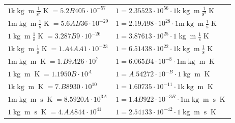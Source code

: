 \begin{center}
\begin{longtable}{l l}
{\color{gray}$1 \bm{\mathrm{ k}}\operatorname{kg}{\operatorname{m}}\frac1{\operatorname{s}^2}{}{\operatorname{K}} = 5.2B405\cdot10^{-57} $}   & {\color{gray}$ 1 = 2.35523\cdot10^{56} \cdot 1 \bm{\mathrm{ k}}\operatorname{kg}{\operatorname{m}}\frac1{\operatorname{s}^2}{}{\operatorname{K}}$}  \\
{\color{gray}$1 \bm{\mathrm{ m}}\operatorname{kg}{\operatorname{m}}\frac1{\operatorname{s}}{}{\operatorname{K}} = 5.6AB36\cdot10^{-29} $}   & {\color{gray}$ 1 = 2.19A98\cdot10^{28} \cdot 1 \bm{\mathrm{ m}}\operatorname{kg}{\operatorname{m}}\frac1{\operatorname{s}}{}{\operatorname{K}}$}  \\
{\color{black}$1 \bm{\mathrm{ }}\operatorname{kg}{\operatorname{m}}\frac1{\operatorname{s}}{}{\operatorname{K}} = 3.287B9\cdot10^{-26} $}   & {\color{black}$ 1 = 3.87613\cdot10^{25} \cdot 1 \bm{\mathrm{ }}\operatorname{kg}{\operatorname{m}}\frac1{\operatorname{s}}{}{\operatorname{K}}$}  \\
{\color{gray}$1 \bm{\mathrm{ k}}\operatorname{kg}{\operatorname{m}}\frac1{\operatorname{s}}{}{\operatorname{K}} = 1.A4AA1\cdot10^{-23} $}   & {\color{gray}$ 1 = 6.51438\cdot10^{22} \cdot 1 \bm{\mathrm{ k}}\operatorname{kg}{\operatorname{m}}\frac1{\operatorname{s}}{}{\operatorname{K}}$}  \\
{\color{gray}$1 \bm{\mathrm{ m}}\operatorname{kg}{\operatorname{m}}{}{}{\operatorname{K}} = 1.B9A26\cdot10^{7} $}   & {\color{gray}$ 1 = 6.065B4\cdot10^{-8} \cdot 1 \bm{\mathrm{ m}}\operatorname{kg}{\operatorname{m}}{}{}{\operatorname{K}}$}  \\
{\color{black}$1 \bm{\mathrm{ }}\operatorname{kg}{\operatorname{m}}{}{}{\operatorname{K}} = 1.1950B\cdot10^{A} $}   & {\color{black}$ 1 = A.54272\cdot10^{-B} \cdot 1 \bm{\mathrm{ }}\operatorname{kg}{\operatorname{m}}{}{}{\operatorname{K}}$}  \\
{\color{gray}$1 \bm{\mathrm{ k}}\operatorname{kg}{\operatorname{m}}{}{}{\operatorname{K}} = 7.B8930\cdot10^{10} $}   & {\color{gray}$ 1 = 1.60735\cdot10^{-11} \cdot 1 \bm{\mathrm{ k}}\operatorname{kg}{\operatorname{m}}{}{}{\operatorname{K}}$}  \\
{\color{gray}$1 \bm{\mathrm{ m}}\operatorname{kg}{\operatorname{m}}{\operatorname{s}}{}{\operatorname{K}} = 8.5920A\cdot10^{3A} $}   & {\color{gray}$ 1 = 1.4B922\cdot10^{-3B} \cdot 1 \bm{\mathrm{ m}}\operatorname{kg}{\operatorname{m}}{\operatorname{s}}{}{\operatorname{K}}$}  \\
{\color{black}$1 \bm{\mathrm{ }}\operatorname{kg}{\operatorname{m}}{\operatorname{s}}{}{\operatorname{K}} = 4.AA844\cdot10^{41} $}   & {\color{black}$ 1 = 2.54133\cdot10^{-42} \cdot 1 \bm{\mathrm{ }}\operatorname{kg}{\operatorname{m}}{\operatorname{s}}{}{\operatorname{K}}$}  \\

\end{longtable}
\end{center}
